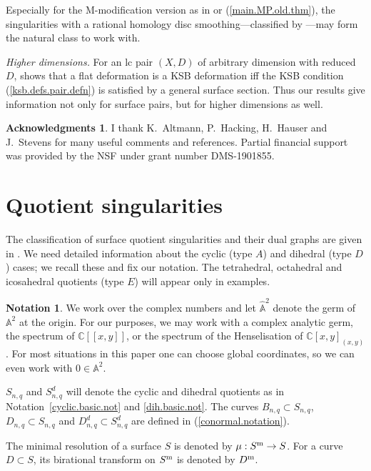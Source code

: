 \documentclass{amsart}
\theoremstyle{definition}
\newtheorem*{ack}{Acknowledgments}      %
\newtheorem{notation}[thm]{Notation}
\theoremstyle{remark}
\renewcommand{\c}[0]{{\mathbb C}}
\renewcommand{\a}[0]{\hat{\mathbb A}}
\begin{document}
Especially for the M-modification version  as in \cite{be-ch} or (\ref{main.MP.old.thm}), the
singularities with a rational homology disc smoothing---classified by \cite{MR2843099}---may form the natural class to work with.

\medskip

{\it Higher dimensions.} For an lc pair $(X, D)$ of arbitrary dimension with reduced $D$, \cite{k-db3} shows that a flat deformation is a KSB  deformation iff the KSB condition (\ref{ksb.defs.pair.defn})  is satisfied by a  general surface section.
  Thus our results give  information not only for surface pairs, but for higher dimensions as well.



\begin{ack}  I thank  K.~Altmann, P.~Hacking, H.~Hauser and J.~Stevens  for many   useful comments and references.
Partial  financial support    was provided  by  the NSF under grant number
DMS-1901855.
\end{ack}


 

\section{Quotient singularities}


The classification of surface quotient singularities and  their dual graphs are given in \cite{briesk}.
We need detailed information about the cyclic (type $A$) and dihedral (type $D$) cases; we recall these and fix our notation.
The tetrahedral, octahedral and icosahedral quotients (type $E$) will appear only in examples.

\begin{notation}
We work over the complex numbers and let $\a^2$ denote the germ of ${\mathbb A}^2$ at the origin. For our purposes, we may work with a complex analytic germ,
the spectrum of $\c[[x,y]]$, or the  spectrum of the Henselisation of
$\c[x,y]_{(x,y)}$.
For most situations in this paper one can choose  global coordinates, so we can even work with   $0\in {\mathbb A}^2$.

$S_{n,q}$ and $S^d_{n,q}$ will denote the cyclic and dihedral
quotients as in Notation~\ref{cyclic.basic.not} and \ref{dih.basic.not}.
The curves  $B_{n,q}\subset S_{n,q}$, $D_{n,q}\subset S_{n,q}$ and $D^d_{n,q}\subset S^d_{n,q}$ are defined in (\ref{conormal.notation}).

The minimal resolution of a surface $S$ is denoted by $\mu:S^{\rm m}\to S$.
For a curve $D\subset S$, its birational transform on $S^{\rm m}$ is denoted by $D^{\rm m}$.
\end{notation}
\end{document}
